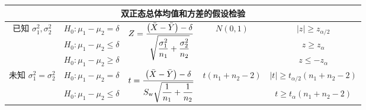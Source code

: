 \begin{table}[H]
{\begin{tabular}{ccccc}
            \multicolumn{5}{c}{\textbf{双正态总体均值和方差的假设检验}}                                                                                                                                                                                                                                                                                                        \\
            \midrule
            \multirow{3}{*}{已知 $\sigma_1^2,\sigma_2^2$} & $H_0:\mu_1-\mu_2=\delta$             & \multirow{3}{*}{$Z=\dfrac{\qty(\bar{X}-\bar{Y})-\delta}{\sqrt{\dfrac{\sigma_1^2}{n_1}+\dfrac{\sigma_2^2}{n_2}}}$} & \multirow{3}{*}{$N(0,1)$}                                                        & $|z|\geqslant z_{\alpha/2}$                           \\
                                                          & $H_0:\mu_1-\mu_2\leqslant \delta$    &                                                                                                                   &                                                                                  & $z\geqslant z_\alpha$                                 \\
                                                          & $H_0:\mu_1-\mu_2\geqslant \delta$    &                                                                                                                   &                                                                                  & $z\leqslant -z_\alpha $                               \\
            \midrule
            \multirow{3}{*}{未知 $\sigma_1^2=\sigma_2^2$} & $H_0:\mu_1-\mu_2=\delta$             & \multirow{3}{*}{$t=\dfrac{\qty(\bar{X}-\bar{Y})-\delta}{S_{\mathrm{w}}\sqrt{\dfrac{1}{n_1}+\dfrac{1}{n_2}}}$}                & \multirow{3}{*}{$t(n_1+n_2-2)$}                                                  & $|t|\geqslant t_{\alpha/2}(n_1+n_2-2)$                \\
                                                          & $H_0:\mu_1-\mu_2\leqslant \delta$    &                                                                                                                   &                                                                                  & $t\geqslant t_{\alpha}(n_1+n_2-2)$                    \\

\end{tabular}}
\end{table}
